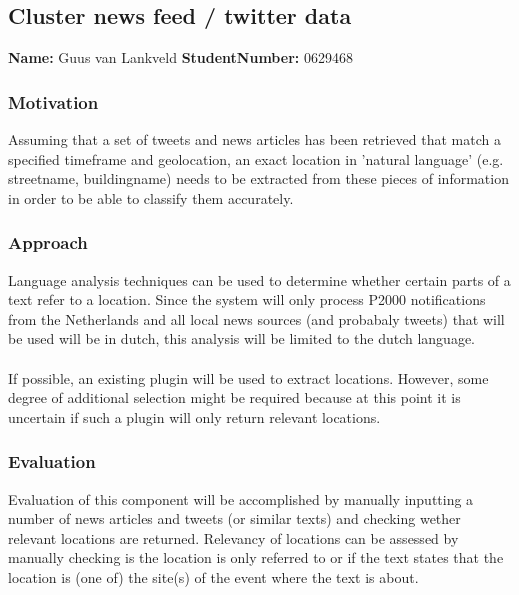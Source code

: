 \subsection{Cluster news feed / twitter data}
\textbf{Name:}  Guus van Lankveld \indent \textbf{StudentNumber:} 0629468

\subsubsection*{Motivation}
Assuming that a set of tweets and news articles has been retrieved that match a specified timeframe and geolocation, an exact location in 'natural language' (e.g. streetname, buildingname) needs to be extracted from these pieces of information in order to be able to classify them accurately. 

\subsubsection*{Approach}
Language analysis techniques can be used to determine whether certain parts of a text refer to a location. Since the system will only process P2000 notifications from the Netherlands and all local news sources (and probabaly tweets) that will be used will be in dutch, this analysis will be limited to the dutch language.\\\\
If possible, an existing plugin will be used to extract locations. However, some degree of additional selection might be required because at this point it is uncertain if such a plugin will only return relevant locations.

\subsubsection*{Evaluation }
Evaluation of this component will be accomplished by manually inputting a number of news articles and tweets (or similar texts) and checking wether relevant locations are returned. Relevancy of locations can be assessed by manually checking is the location is only referred to or if the text states that the location is (one of) the site(s) of the event where the text is about.